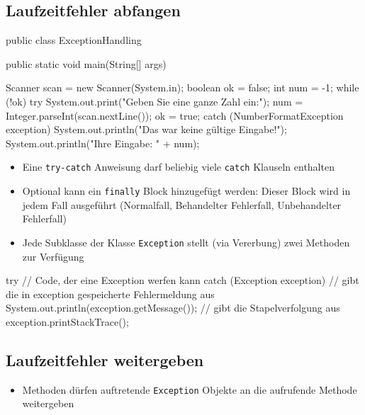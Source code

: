 \documentclass[a4paper,10pt, dvipsnames]{report}
\newcommand{\javaInLine}[1]{\texttt{#1}}
\begin{document}
\subsection{Laufzeitfehler abfangen}

\begin{javacodebox}
public class ExceptionHandling {

    public static void main(String[] args) {

        Scanner scan = new Scanner(System.in);
        boolean ok = false;
        int num = -1;
        while (!ok) {
            try {
                System.out.print("Geben Sie eine ganze Zahl ein:");
                num = Integer.parseInt(scan.nextLine());
                ok = true;
            }
            catch (NumberFormatException exception){
                System.out.println("Das war keine gültige Eingabe!");
            }
        }   
        System.out.println("Ihre Eingabe: " + num);
    }
}  
\end{javacodebox}

\begin{itemize}
	\item Eine \javaInLine{try-catch} Anweisung darf beliebig viele \javaInLine{catch} Klauseln enthalten
	\item Optional kann ein \javaInLine{finally} Block hinzugefügt werden: Dieser Block wird in jedem Fall ausgeführt (Normalfall, Behandelter Fehlerfall, Unbehandelter Fehlerfall)
\end{itemize}


\begin{itemize}
	\item Jede Subklasse der Klasse \javaInLine{Exception} stellt (via Vererbung) zwei Methoden zur Verfügung
\end{itemize}

\begin{javacodebox}
try {
    // Code, der eine Exception werfen kann
}
catch (Exception exception){
    // gibt die in exception gespeicherte Fehlermeldung aus
    System.out.println(exception.getMessage());
    // gibt die Stapelverfolgung aus
    exception.printStackTrace();
}
\end{javacodebox}

\subsection{Laufzeitfehler weitergeben}

\begin{itemize}
	\item Methoden dürfen auftretende \javaInLine{Exception} Objekte an die aufrufende Methode weitergeben
\end{itemize}
\end{document}
